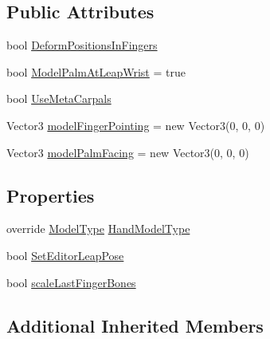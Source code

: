 \subsection*{Public Attributes}
\begin{DoxyCompactItemize}
\item 
bool \mbox{\hyperlink{class_leap_1_1_unity_1_1_rigged_hand_a58577754d59a13b304fd1855bab163cf}{Deform\+Positions\+In\+Fingers}}
\item 
bool \mbox{\hyperlink{class_leap_1_1_unity_1_1_rigged_hand_aba36c91e04e41858d120462170cf7902}{Model\+Palm\+At\+Leap\+Wrist}} = true
\item 
bool \mbox{\hyperlink{class_leap_1_1_unity_1_1_rigged_hand_ad02235db6045a120093cdca16b1e61bf}{Use\+Meta\+Carpals}}
\item 
Vector3 \mbox{\hyperlink{class_leap_1_1_unity_1_1_rigged_hand_ac0ccd96e23893625056adc4929688f5a}{model\+Finger\+Pointing}} = new Vector3(0, 0, 0)
\item 
Vector3 \mbox{\hyperlink{class_leap_1_1_unity_1_1_rigged_hand_a684f30ad8b1293a862bc3f6ddc6fb5a1}{model\+Palm\+Facing}} = new Vector3(0, 0, 0)
\end{DoxyCompactItemize}
\subsection*{Properties}
\begin{DoxyCompactItemize}
\item 
override \mbox{\hyperlink{namespace_leap_1_1_unity_a186e5eb0a2b743f1f6b79346f0ab8ad0}{Model\+Type}} \mbox{\hyperlink{class_leap_1_1_unity_1_1_rigged_hand_aafa1ebadbf7fb5901f22f5834bac4dba}{Hand\+Model\+Type}}
\item 
bool \mbox{\hyperlink{class_leap_1_1_unity_1_1_rigged_hand_ab8de11dc599037ace3a7bce66cdb8b94}{Set\+Editor\+Leap\+Pose}}
\item 
bool \mbox{\hyperlink{class_leap_1_1_unity_1_1_rigged_hand_a5b746af2657245a3e8cad12b081d1fe0}{scale\+Last\+Finger\+Bones}}
\end{DoxyCompactItemize}
\subsection*{Additional Inherited Members}


